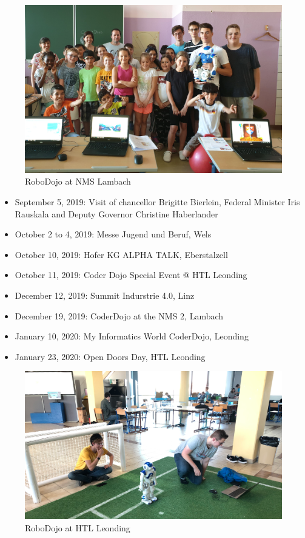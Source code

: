 \documentclass[11pt]{article}
\begin{document}
\begin{figure}
\begin{center}
\includegraphics[scale=0.25]{img/activityImage2.png}
\end{center}
\caption{RoboDojo at NMS Lambach}
\label{fig:rcjWinners}
\end{figure}

\begin{itemize}
	\item September 5, 2019: Visit of chancellor Brigitte Bierlein, Federal Minister Iris Rauskala and Deputy Governor Christine Haberlander
	\item October 2 to 4, 2019: Messe Jugend und Beruf, Wels
	\item  October 10, 2019: Hofer KG ALPHA TALK, Eberstalzell
	\item  October 11, 2019: Coder Dojo Special Event @ HTL Leonding
	\item  December 12, 2019: Summit Indurstrie 4.0, Linz
	\item  December 19, 2019: CoderDojo at the NMS 2, Lambach
	\item  January 10, 2020: My Informatics World CoderDojo, Leonding
	\item  January 23, 2020: Open Doors Day, HTL Leonding
\end{itemize}

\begin{figure}
\begin{center}
\includegraphics[scale=0.25]{img/activityImage3.png}
\end{center}
\caption{RoboDojo at HTL Leonding}
\label{fig:soccerTraining}
\end{figure}
\end{document}
